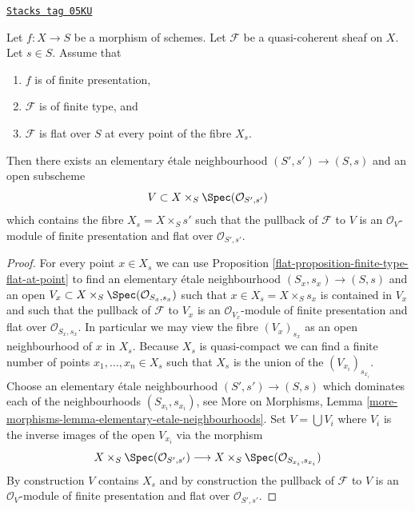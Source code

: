 \begin{lemma}
\label{flat-lemma-finite-type-flat-along-fibre}
\href{https://stacks.math.columbia.edu/tag/05KU}{\texttt{Stacks tag 05KU}}

Let $f : X \to S$ be a morphism of schemes.
Let $\mathcal{F}$ be a quasi-coherent sheaf on $X$.
Let $s \in S$.
Assume that
\begin{enumerate}
\item $f$ is of finite presentation,
\item $\mathcal{F}$ is of finite type, and
\item $\mathcal{F}$ is flat over $S$ at every point of the fibre $X_s$.
\end{enumerate}
Then there exists an elementary \'etale neighbourhood $(S', s') \to (S, s)$
and an open subscheme
$$
V \subset X \times_S \Spec(\mathcal{O}_{S', s'})
$$
which contains the fibre $X_s = X \times_S s'$ such that the pullback
of $\mathcal{F}$ to $V$ is an $\mathcal{O}_V$-module
of finite presentation and flat over $\mathcal{O}_{S', s'}$.
\end{lemma}

\begin{proof}

For every point $x \in X_s$ we can use
Proposition \ref{flat-proposition-finite-type-flat-at-point}
to find an elementary \'etale neighbourhood $(S_x, s_x) \to (S, s)$
and an open $V_x \subset X \times_S \Spec(\mathcal{O}_{S_x, s_x})$
such that $x \in X_s = X \times_S s_x$ is contained in $V_x$ and such that
the pullback of $\mathcal{F}$ to $V_x$ is an
$\mathcal{O}_{V_x}$-module of finite presentation and flat over
$\mathcal{O}_{S_x, s_x}$. In particular we may view the fibre
$(V_x)_{s_x}$ as an open neighbourhood of $x$ in $X_s$.
Because $X_s$ is quasi-compact we can find a finite number of points
$x_1, \ldots, x_n \in X_s$ such that $X_s$ is the union of
the $(V_{x_i})_{s_{x_i}}$. Choose an elementary \'etale neighbourhood
$(S' , s') \to (S, s)$ which dominates each of the neighbourhoods
$(S_{x_i}, s_{x_i})$, see
More on Morphisms,
Lemma \ref{more-morphisms-lemma-elementary-etale-neighbourhoods}.
Set $V = \bigcup V_i$ where $V_i$ is the inverse images of the open
$V_{x_i}$ via the morphism
$$
X \times_S \Spec(\mathcal{O}_{S', s'})
\longrightarrow
X \times_S \Spec(\mathcal{O}_{S_{x_i}, s_{x_i}})
$$
By construction $V$ contains $X_s$ and by construction the pullback
of $\mathcal{F}$ to $V$ is an $\mathcal{O}_V$-module
of finite presentation and flat over $\mathcal{O}_{S', s'}$.
\end{proof}

